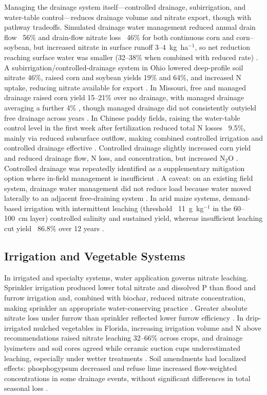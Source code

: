 \documentclass[11pt]{article}
\begin{document}
Managing the drainage system itself---controlled drainage, subirrigation, and water-table control---reduces drainage volume and nitrate export, though with pathway tradeoffs. Simulated drainage water management reduced annual drain flow ~56\% and drain-flow nitrate loss ~46\% for both continuous corn and corn--soybean, but increased nitrate in surface runoff 3--4~kg~ha$^{-1}$, so net reduction reaching surface water was smaller (32--38\% when combined with reduced rate) \parencite{Ale2012b}. A subirrigation/controlled-drainage system in Ohio lowered deep-profile soil nitrate 46\%, raised corn and soybean yields 19\% and 64\%, and increased N uptake, reducing nitrate available for export \parencite{Fisher1999}. In Missouri, free and managed drainage raised corn yield 15--21\% over no drainage, with managed drainage averaging a further 4\% \parencite{Nash2015}, though managed drainage did not consistently outyield free drainage across years \parencite{Nash2015b}. In Chinese paddy fields, raising the water-table control level in the first week after fertilization reduced total N losses ~9.5\%, mainly via reduced subsurface outflow, making combined controlled irrigation and controlled drainage effective \parencite{He2019b}. Controlled drainage slightly increased corn yield and reduced drainage flow, N loss, and concentration, but increased N$_2$O \parencite{Wang2016b}. Controlled drainage was repeatedly identified as a supplementary mitigation option where in-field management is insufficient \parencite{HernandezRamirez2011}. A caveat: on an existing field system, drainage water management did not reduce load because water moved laterally to an adjacent free-draining system \parencite{David2015}. In arid maize systems, demand-based irrigation with intermittent leaching (threshold ~11~g~kg$^{-1}$ in the 60--100~cm layer) controlled salinity and sustained yield, whereas insufficient leaching cut yield ~86.8\% over 12 years \parencite{Liu2024}.

\subsection{Irrigation and Vegetable Systems}

In irrigated and specialty systems, water application governs nitrate leaching. Sprinkler irrigation produced lower total nitrate and dissolved P than flood and furrow irrigation and, combined with biochar, reduced nitrate concentration, making sprinkler an appropriate water-conserving practice \parencite{Farahani2020}. Greater absolute nitrate loss under furrow than sprinkler reflected lower furrow efficiency \parencite{Hurtado2011}. In drip-irrigated mulched vegetables in Florida, increasing irrigation volume and N above recommendations raised nitrate leaching 32--66\% across crops, and drainage lysimeters and soil cores agreed while ceramic suction cups underestimated leaching, especially under wetter treatments \parencite{Zotarelli2007}. Soil amendments had localized effects: phosphogypsum decreased and refuse lime increased flow-weighted concentrations in some drainage events, without significant differences in total seasonal loss \parencite{Hurtado2011}.
\end{document}
